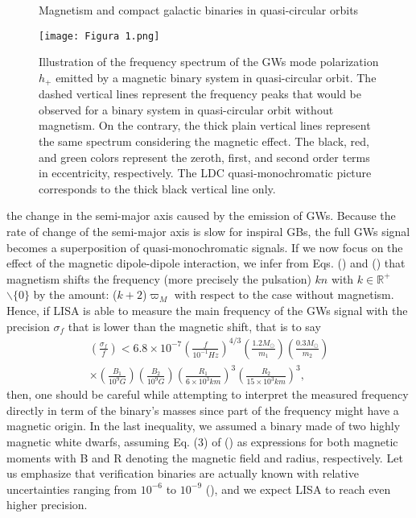 \documentclass[a4paper,10.5pt]{article}
\begin{document}
\begin{figure}[H]
    \centering
    \caption{Magnetism and compact galactic binaries in quasi-circular orbits}
    \texttt{[image: Figura 1.png]}
    \caption{Illustration of the frequency spectrum of the GWs mode polarization $h_+$ emitted by a magnetic binary system in quasi-circular orbit. The dashed vertical lines represent the frequency peaks that would be observed for a binary system in quasi-circular orbit without magnetism. On the contrary, the thick plain vertical lines represent the same spectrum considering the magnetic effect. The black, red, and green colors represent the zeroth, first, and second order terms in eccentricity, respectively. The LDC quasi-monochromatic picture corresponds to the thick black vertical line only.
}
    \label{Figura 1}
\end{figure}
the change in the semi-major axis caused by the emission of GWs. Because the rate of change of the semi-major axis is slow for inspiral GBs, the full GWs signal becomes a superposition of quasi-monochromatic signals. If we now focus on the effect of the magnetic dipole-dipole interaction, we infer from Eqs. () and () that magnetism shifts the frequency (more precisely the pulsation) $kn$ with $k\in\mathbb{R}^+$ $\backslash\{0\}$ by the amount: ($k+2$)$\varpi_M$ with respect to the case without magnetism. Hence, if LISA is able to measure the main frequency of the GWs signal with the precision $\sigma_f$ that is lower than the magnetic shift, that is to say
\begin{equation} \tag{2.6}
\begin{split}
\left(\frac{\sigma_f}{f}\right) < 6.8 \times 10^{-7}\left(\frac{f}{10^{-1}Hz}\right)^{4/3}\left(\frac{1.2M_\odot}{m_1}\right) \left(\frac{0.3M_\odot}{m_2}\right)\\ \times\left(\frac{B_1}{10^9G}\right)\left(\frac{B_2}{10^9G}\right) \left(\frac{R_1}{6\times10^3km}\right)^3 \left(\frac{R_2}{15\times 10^3km} \right)^3,
\end{split}
\end{equation}
then, one should be careful while attempting to interpret the measured frequency directly in term of the binary’s masses since part of the frequency might have a magnetic origin. In the last inequality, we assumed a binary made of two highly magnetic white dwarfs, assuming Eq. (3) of  () as expressions for both magnetic moments with B and R denoting the magnetic field and radius, respectively. Let us emphasize that verification binaries are actually known with relative uncertainties ranging from $10^{-6}$ to $10^{-9}$ (), and we expect LISA to reach even higher precision.
\end{document}
